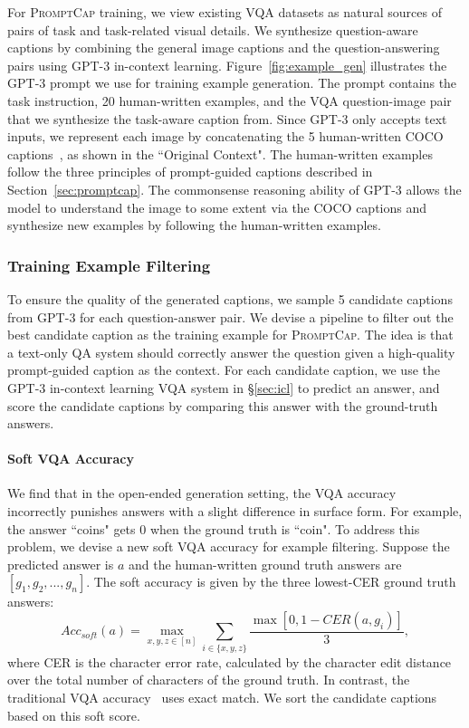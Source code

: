 \documentclass[10pt,twocolumn,letterpaper]{article}
\newcommand{\NAME}{\textsc{PromptCap}\xspace}
\begin{document}
For \NAME training, we view existing VQA datasets as natural sources of pairs of task and task-related visual details.
We synthesize question-aware captions by combining the general image captions and the question-answering pairs using GPT-3 in-context learning.
Figure~\ref{fig:example_gen} illustrates the GPT-3 prompt we use for training example generation.
The prompt contains the task instruction, 20 human-written examples, and the VQA question-image pair that we synthesize the task-aware caption from.
Since GPT-3 only accepts text inputs, we represent each image by concatenating the 5 human-written COCO captions~\cite{chen2015microsoft}, as shown in the ``Original Context". 
The human-written examples follow the three principles of prompt-guided captions described in Section~\ref{sec:promptcap}.
The commonsense reasoning ability of GPT-3 allows the model to understand the image to some extent via the COCO captions and synthesize new examples by following the human-written examples.

\vspace{-0.1in}
\subsubsection{Training Example Filtering}
To ensure the quality of the generated captions, we sample 5 candidate captions from GPT-3 for each question-answer pair.
We devise a pipeline to filter out the best candidate caption as the training example for \NAME.
The idea is that a text-only 
QA system should correctly answer the question given a high-quality prompt-guided caption as the context.
For each candidate caption, we use the GPT-3 in-context learning VQA system in \S\ref{sec:icl} to predict an answer, and score the candidate captions by comparing this answer with the ground-truth answers.

\vspace{-0.1in}
\paragraph{Soft VQA Accuracy} We find that in the open-ended generation setting, the VQA accuracy~\cite{goyal2017making} incorrectly punishes answers with a slight difference in surface form. 
For example, the answer ``coins" gets $0$ when the ground truth is ``coin".
To address this problem, we devise a new soft VQA accuracy for example filtering.
Suppose the predicted answer is $a$ and the human-written ground truth answers are $[g_1, g_2, ..., g_n]$. The soft accuracy is given by 
the three lowest-CER ground truth answers:
\begin{equation*}
    \mathit{Acc}_{\mathit{soft}}(a) = \underset{x,y,z \in [n]}{\max}{\sum_{i \in \{x,y,z\}}\frac{\max[0, 1-\mathit{CER}(a, g_i)]}{3}},
\end{equation*}
where CER is the character error rate, calculated by the character edit distance over the total number of characters of the ground truth. 
In contrast, the traditional VQA accuracy~\cite{goyal2017making} uses exact match.
We sort the candidate captions based on this soft score.
\end{document}
